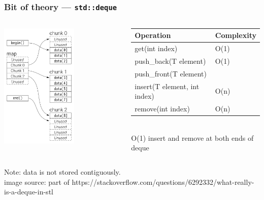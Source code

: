 \documentclass[aspectratio=169]{beamer}
\newcommand{\cpp}[1]{\texttt{\textbf{\textcolor{clCodeBlue}{#1}}}}
\newcommand\fontV{\fontsize{5}{5}\selectfont}
\newcommand\addsource[1]{\fontV\textcolor{clGray}{#1}}
\begin{document}
\begin{frame}
\frametitle{Bit of theory --- \cpp{std::deque}}
\begin{columns}
  \begin{column}{0.38\textwidth}
    \includegraphics[width=0.6\textwidth]{pictures/deque_layout.png} \\
  \end{column}\hfill%
  \begin{column}{0.58\textwidth}
    \begin{tabular}{|l|l|}
      \hline
      Operation & Complexity \\
      \hline\hline
      get(int index) & O(1) \\
      \hline
      push\_back(T element) & O(1) \\
      push\_front(T element) & \\
      \hline
      insert(T element, int index) & \textcolor{clRedFlag}{O(n)} \\
      \hline
      remove(int index) & \textcolor{clRedFlag}{O(n)} \\
      \hline
    \end{tabular} \\
    \textcolor{clGreenFlag}{O(1)} insert and remove at both ends of deque
  \end{column}
\end{columns}
\vspace*{24pt}
{\centering Note: data is not stored contiguously.\\}
\vspace*{12pt}
\addsource{image source: part of https://stackoverflow.com/questions/6292332/what-really-is-a-deque-in-stl}
\end{frame}
\end{document}
